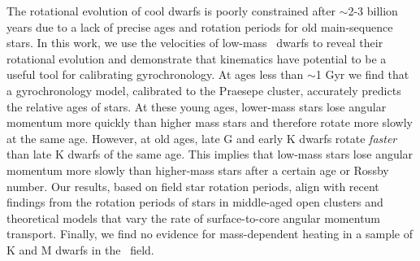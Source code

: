 
The rotational evolution of cool dwarfs is poorly constrained after $\sim$2-3
billion years due to a lack of precise ages and rotation periods for old
main-sequence stars.
In this work, we use the velocities of low-mass \kepler\ dwarfs to reveal
their rotational evolution and demonstrate that kinematics have potential to
be a useful tool for calibrating gyrochronology.
At ages less than $\sim$1 Gyr we find that a gyrochronology model, calibrated
to the Praesepe cluster, accurately predicts the relative ages of stars.
At these young ages, lower-mass stars lose angular momentum more quickly than
higher mass stars and therefore rotate more slowly at the same age.
However, at old ages, late G and early K dwarfs rotate {\it faster} than late
K dwarfs of the same age.
This implies that low-mass stars lose angular momentum more slowly than
higher-mass stars after a certain age or Rossby number.
Our results, based on field star rotation periods, align with recent findings
from the rotation periods of stars in middle-aged open clusters and
theoretical models that vary the rate of surface-to-core angular momentum
transport.
Finally, we find no evidence for mass-dependent heating in a sample of K and M
dwarfs in the \kepler\ field.

